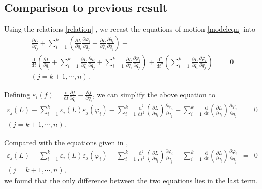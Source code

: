 \documentclass[preprint,11pt]{elsarticle}
\newcommand{\mathd}{\mathrm{d}}
\begin{document}
\subsection{Comparison to previous result}
Using the relations \eqref{relation} , we recast the equations of motion \eqref{modeleqn} into
\begin{equation}
\begin{array}{lcl}
  \frac{\partial L}{\partial q_j} + \sum_{i = 1}^k \left( \frac{\partial
   L}{\partial q_i}  \frac{\partial \varphi_i}{\partial q_j}  +
   \frac{\partial L}{\partial \dot{q_i}}  \frac{\partial \dot{q_i}}{\partial
   q_j} \right) - & &\\[12pt]
   \frac{\mathd}{\mathd t} \left( \frac{\partial L}{\partial
   \dot{q_j}} + \sum_{i = 1}^k \frac{\partial L}{\partial \dot{q_i}}
   \frac{\partial \dot{q_i}}{\partial \dot{q_j}} + \sum_{i = 1}^k
   \frac{\partial L}{\partial q_i}  \frac{\partial \varphi_i}{\partial
   \dot{q_j}} \right)
    + \frac{\mathd^2}{\mathd t^2}  \left( \sum_{i = 1}^k
   \frac{\partial L}{\partial \dot{q_i}}  \frac{\partial \varphi_i}{\partial
   \dot{q_j}} \right) &=& 0\\
   ( j = k + 1, \cdots, n). & &
\end{array}
\end{equation}

Defining $\varepsilon_i ( f) = \frac{\mathd}{\mathd t} \frac{\partial
f}{\partial \dot{q_i}} - \frac{\partial f}{\partial q_i}$, we can simplify the above equation to
\begin{equation}\label{simplifiedeeom}
\begin{array}{lcl}
  \varepsilon_j ( L) - \sum_{i = 1}^k \varepsilon_i ( L) \varepsilon_j (
   \varphi_i) - \sum_{i = 1}^k \frac{\mathd^2}{\mathd t^2} \left(
   \frac{\partial L}{\partial \dot{q_i}} \right) \frac{\partial
   \varphi_i}{\partial \dot{q_j}} + \sum_{i = 1}^k \frac{\mathd}{\mathd t}
   \left( \frac{\partial L}{\partial \dot{q_i}} \right)  \frac{\partial
   \varphi_i}{\partial q_j} &= &0 \\
   ( j = k + 1, \cdots, n). & &
   \end{array}
\end{equation}

Compared with the equations given in \cite{Gao2005},
\begin{equation}
\begin{array}{lcl}
   \varepsilon_j ( L) - \sum_{i = 1}^k \varepsilon_i ( L) \varepsilon_j (
   \varphi_i) - \sum_{i = 1}^k \frac{\mathd^2}{\mathd t^2} \left(
   \frac{\partial L}{\partial \dot{q_i}} \right) \frac{\partial
   \varphi_i}{\partial \dot{q_j}} + \sum_{i = 1}^k \frac{\mathd}{\mathd t}
   \left( \frac{\partial L}{\partial q_i} \right)  \frac{\partial
   \varphi_i}{\partial \dot{q_j}}& = &0 \\
   ( j = k + 1, \cdots, n), & &
\end{array}
\end{equation}
we found that the only difference between the two equations lies in the last term.
\end{document}
